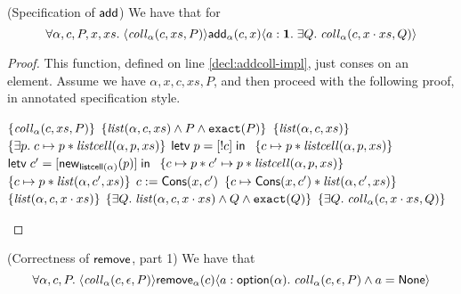 \begin{lemma}{(Specification of $\mathsf{add}$)}
We have that for 
\begin{displaymath}
  \forall \alpha, c, P, x, xs.\; \langle{\mathit{coll}_\alpha(c, xs, P)}\rangle{\mathsf{add}_\alpha(c, x)}\langle{a:\mathbf{1}}.\;{\exists Q.\; \mathit{coll}_\alpha(c, x\cdot xs, Q)}\rangle
\end{displaymath}
\end{lemma}

\begin{proof}
  This function, defined on line \ref{decl:addcoll-impl}, just conses on an element. 
Assume we have $\alpha, x, c, xs, P$, and then proceed with the following proof, in
annotated specification style. 

\begin{specification}
\nextline $\{{\mathit{coll}_\alpha(c, xs, P)}\}$ 
\nextline $\{{\mathit{list}(\alpha, c, xs) \land P \land \mathtt{exact}({P})}\}$ 
\nextline $\{{\mathit{list}(\alpha, c, xs)}\}$ 
\nextline $\{{\exists p.\; c \mapsto p * \mathit{listcell}(\alpha, p, xs)}\}$ 
\nextline $\mathsf{letv}\;p = [!c]\;\mathsf{in}\;$ 
\nextline $\{{c \mapsto p * \mathit{listcell}(\alpha, p, xs)}\}$ 
\nextline $\mathsf{letv}\;c' = [\mathsf{new}_{\mathsf{listcell}(\alpha)}(p)]\;\mathsf{in}\;$
\nextline $\{{c \mapsto p * c' \mapsto p * \mathit{listcell}(\alpha, p, xs)}\}$ 
\nextline $\{{c \mapsto p * \mathit{list}(\alpha, c', xs)}\}$ 
\nextline $c := \mathsf{Cons}(x, c')$ 
\nextline $\{{c \mapsto \mathsf{Cons}(x, c') * \mathit{list}(\alpha, c', xs)}\}$ 
\nextline $\{{\mathit{list}(\alpha, c, x\cdot xs)}\}$ 
\nextline $\{{\exists Q.\; \mathit{list}(\alpha, c, x\cdot xs) \land Q \land \mathtt{exact}({Q})}\}$ 
\nextline $\{{\exists Q.\; \mathit{coll}_\alpha(c, x\cdot xs, Q)}\}$ 
\end{specification}
\end{proof}

\begin{lemma}{(Correctness of $\mathsf{remove}$, part 1)}
We have that 
\begin{displaymath}
  \forall \alpha, c, P.\; \langle{\mathit{coll}_\alpha(c, \epsilon, P)}\rangle{\mathsf{remove}_\alpha(c)}\langle{a:\mathsf{option }{(\alpha)}}.\;{\mathit{coll}_\alpha(c, \epsilon, P) \land a = \mathsf{None}}\rangle
\end{displaymath}
\end{lemma}

